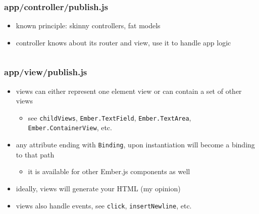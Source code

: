 \documentclass[compress]{beamer}
\begin{document}
\begin{frame}

\frametitle{app/controller/publish.js}

\begin{itemize}[<+->]
  \item known principle: skinny controllers, fat models
  \item controller knows about its router and view, use it to handle app logic
\end{itemize}

\inputminted[fontsize=\tiny,gobble=2,linenos=true,firstline=6,lastline=19]{javascript}{code/js/app/controller/publish.js}

\end{frame}

\begin{frame}

\frametitle{app/view/publish.js}

\begin{itemize}[<+->]
  \item views can either represent one element view or can contain a set of other views
  \begin{itemize}[<+->]
    \item see \texttt{childViews}, \texttt{Ember.TextField}, \texttt{Ember.TextArea}, \texttt{Ember.ContainerView}, etc.
  \end{itemize}
  \item any attribute ending with \texttt{Binding}, upon instantiation will become a binding to that path
  \begin{itemize}[<+->]
    \item it is available for other Ember.js components as well
  \end{itemize}
  \item ideally, views will generate your HTML (my opinion)
  \item views also handle events, see \texttt{click}, \texttt{insertNewline}, etc.
\end{itemize}

\inputminted[fontsize=\tiny,gobble=2,linenos=true,firstline=6,lastline=21]{javascript}{code/js/app/view/publish.js}

\end{frame}
\end{document}
